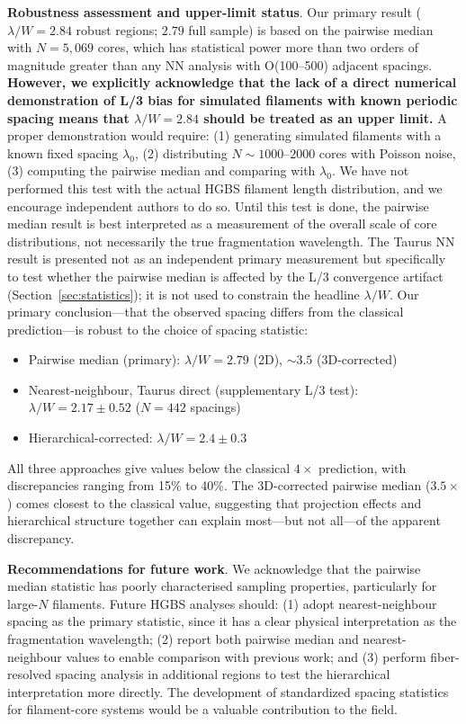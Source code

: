 \documentclass[twoside,twocolumn]{mnras}
\begin{document}
\textbf{Robustness assessment and upper-limit status}. Our primary result ($\lambda/W = 2.84$ robust regions; $2.79$ full sample) is based on the pairwise median with $N = 5{,}069$ cores, which has statistical power more than two orders of magnitude greater than any NN analysis with O(100--500) adjacent spacings. \textbf{However, we explicitly acknowledge that the lack of a direct numerical demonstration of L/3 bias for simulated filaments with known periodic spacing means that $\lambda/W = 2.84$ should be treated as an upper limit.} A proper demonstration would require: (1) generating simulated filaments with a known fixed spacing $\lambda_0$, (2) distributing $N \sim 1000$--$2000$ cores with Poisson noise, (3) computing the pairwise median and comparing with $\lambda_0$. We have not performed this test with the actual HGBS filament length distribution, and we encourage independent authors to do so. Until this test is done, the pairwise median result is best interpreted as a measurement of the overall scale of core distributions, not necessarily the true fragmentation wavelength. The Taurus NN result is presented not as an independent primary measurement but specifically to test whether the pairwise median is affected by the L/3 convergence artifact (Section~\ref{sec:statistics}); it is not used to constrain the headline $\lambda/W$. Our primary conclusion---that the observed spacing differs from the classical prediction---is robust to the choice of spacing statistic:
\begin{itemize}
    \item Pairwise median (primary): $\lambda/W = 2.79$ (2D), $\sim 3.5$ (3D-corrected)
    \item Nearest-neighbour, Taurus direct (supplementary L/3 test): $\lambda/W = 2.17 \pm 0.52$ ($N = 442$ spacings)
    \item Hierarchical-corrected: $\lambda/W = 2.4 \pm 0.3$
\end{itemize}
All three approaches give values below the classical $4\times$ prediction, with discrepancies ranging from 15\% to 40\%. The 3D-corrected pairwise median ($3.5\times$) comes closest to the classical value, suggesting that projection effects and hierarchical structure together can explain most—but not all—of the apparent discrepancy.

\textbf{Recommendations for future work}. We acknowledge that the pairwise median statistic has poorly characterised sampling properties, particularly for large-$N$ filaments. Future HGBS analyses should: (1) adopt nearest-neighbour spacing as the primary statistic, since it has a clear physical interpretation as the fragmentation wavelength; (2) report both pairwise median and nearest-neighbour values to enable comparison with previous work; and (3) perform fiber-resolved spacing analysis in additional regions to test the hierarchical interpretation more directly. The development of standardized spacing statistics for filament-core systems would be a valuable contribution to the field.
\end{document}
